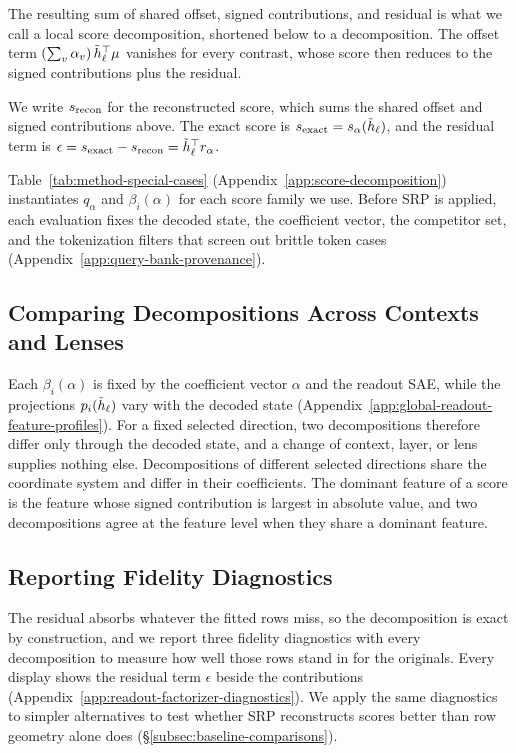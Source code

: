 The resulting sum of shared offset, signed contributions, and
residual is what we call a local score decomposition, shortened below
to a decomposition. The
offset term
\(\left(\sum_v\alpha_v\right) \tilde h_\ell^\top\mu\) vanishes
for every contrast, whose score then reduces to the signed
contributions plus the residual.

We write \(s_{\mathrm{recon}}\) for the reconstructed score, which sums the
shared offset and signed contributions above. The exact score is
\(s_{\mathrm{exact}}=s_\alpha(\tilde h_\ell)\), and the residual term is
\(\epsilon=s_{\mathrm{exact}}-s_{\mathrm{recon}}
=\tilde h_\ell^\top r_\alpha\).

Table~\ref{tab:method-special-cases}
(Appendix~\ref{app:score-decomposition}) instantiates \(q_\alpha\) and
\(\beta_i(\alpha)\) for each score family we use. Before
SRP is applied, each evaluation fixes the decoded state, the
coefficient vector, the competitor set, and the tokenization filters
that screen out brittle token cases
(Appendix~\ref{app:query-bank-provenance}).

\subsection{Comparing Decompositions Across Contexts and Lenses}
\label{sec:method-comparing-accounts}

Each \(\beta_i(\alpha)\) is fixed by the coefficient
vector \(\alpha\) and the readout SAE, while the projections
\(p_i(\tilde h_\ell)\) vary with the decoded state
(Appendix~\ref{app:global-readout-feature-profiles}). For a fixed
selected direction, two decompositions therefore differ only through
the decoded state, and a change of context, layer, or lens supplies
nothing else. Decompositions of different selected directions share
the coordinate system and differ in their coefficients. The dominant feature of a score
is the feature whose signed contribution is largest in absolute value,
and two decompositions agree at the feature level when they
share a dominant feature.

\subsection{Reporting Fidelity Diagnostics}
\label{sec:method-reading-local-accounts}

The residual absorbs whatever the fitted rows miss, so the
decomposition is exact by construction, and we report three fidelity
diagnostics with every decomposition to measure how well those rows
stand in for the originals. Every display shows the residual term
\(\epsilon\) beside the contributions
(Appendix~\ref{app:readout-factorizer-diagnostics}). We apply the same
diagnostics to simpler alternatives to test whether SRP
reconstructs scores better than row geometry alone does
(\S\ref{subsec:baseline-comparisons}).

